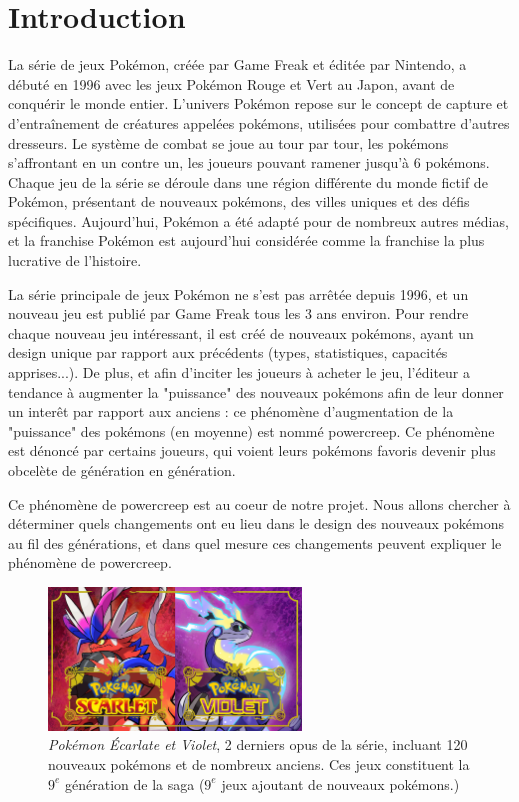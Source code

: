 \documentclass[a4paper,12pt]{article}
\begin{document}
\section{Introduction}
La série de jeux Pokémon, créée par Game Freak et éditée par Nintendo, a débuté
en 1996 avec les jeux Pokémon Rouge et Vert au Japon, avant de conquérir le
monde entier. L'univers Pokémon repose sur le concept de capture et
d'entraînement de créatures appelées pokémons, utilisées pour combattre d'autres
dresseurs. Le système de combat se joue au tour par tour, les pokémons
s'affrontant en un contre un, les joueurs pouvant ramener jusqu'à 6 pokémons.
Chaque jeu de la série se déroule dans une région différente du monde fictif de
Pokémon, présentant de nouveaux pokémons, des villes uniques et des défis
spécifiques. Aujourd'hui, Pokémon a été adapté pour de nombreux autres médias,
et la franchise Pokémon est aujourd'hui considérée comme la franchise la plus
lucrative de l'histoire.

La série principale de jeux Pokémon ne s'est pas arrêtée depuis 1996, et un
nouveau jeu est publié par Game Freak tous les 3 ans environ. Pour rendre chaque
nouveau jeu intéressant, il est créé de nouveaux pokémons, ayant un design
unique par rapport aux précédents (types, statistiques, capacités apprises...).
De plus, et afin d'inciter les joueurs à acheter le jeu, l'éditeur a tendance à
augmenter la "puissance" des nouveaux pokémons afin de leur donner un interêt
par rapport aux anciens : ce phénomène d'augmentation de la "puissance" des
pokémons (en moyenne) est nommé powercreep. Ce phénomène est dénoncé par
certains joueurs, qui voient leurs pokémons favoris devenir plus obcelète de
génération en génération. 

Ce phénomène de powercreep est au coeur de notre projet. Nous allons chercher à
déterminer quels changements ont eu lieu dans le design des nouveaux pokémons au
fil des générations, et dans quel mesure ces changements peuvent expliquer le
phénomène de powercreep.

\begin{figure}[!h]
    \centering
    \includegraphics[width=0.6\textwidth]{Image/scarlet-violet.jpg}
    \caption{\textit{Pokémon Écarlate et Violet}, 2 derniers opus de la série,
    incluant 120 nouveaux pokémons et de nombreux anciens. Ces jeux constituent
    la $9^{e}$ génération de la saga ($9^{e}$  jeux ajoutant de nouveaux
    pokémons.)}
    \label{fig:image1}
\end{figure}
\end{document}
